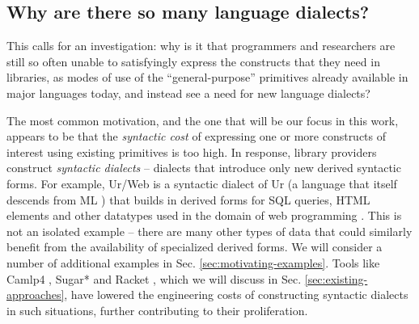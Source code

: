 \subsection{Why are there so many language dialects?}
{This calls for an investigation}: why is it that programmers and researchers are still so often unable to satisfyingly express the constructs that they need in libraries, as modes of use of the ``general-purpose'' primitives already available in major languages today, and instead see a need for new language dialects?

The most common motivation, and the one that will be our focus in this work, appears to be that the \emph{syntactic cost} of expressing one or more constructs of interest using existing primitives is too high. In response, library providers construct \emph{syntactic dialects} -- dialects that introduce only new derived syntactic forms. 
For example, Ur/Web is a syntactic dialect of Ur (a language that itself descends from ML \cite{conf/pldi/Chlipala10}) that builds in derived forms for SQL queries, HTML elements and other datatypes used in the domain of web programming \cite{conf/popl/Chlipala15}. %
This is not an isolated example -- there are many other types of data that could similarly benefit from the availability of specialized derived forms. We will consider a number of additional examples in Sec. \ref{sec:motivating-examples}. 
Tools like Camlp4 \cite{ocaml-manual}, Sugar* \cite{erdweg2011sugarj,erdweg2013framework} and Racket \cite{Flatt:2012:CLR:2063176.2063195}, which we will discuss in Sec. \ref{sec:existing-approaches}, have lowered the engineering costs of constructing syntactic dialects in such situations, further contributing to their proliferation. 

